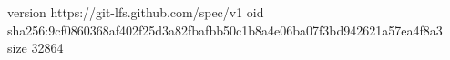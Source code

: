 version https://git-lfs.github.com/spec/v1
oid sha256:9cf0860368af402f25d3a82fbafbb50c1b8a4e06ba07f3bd942621a57ea4f8a3
size 32864
